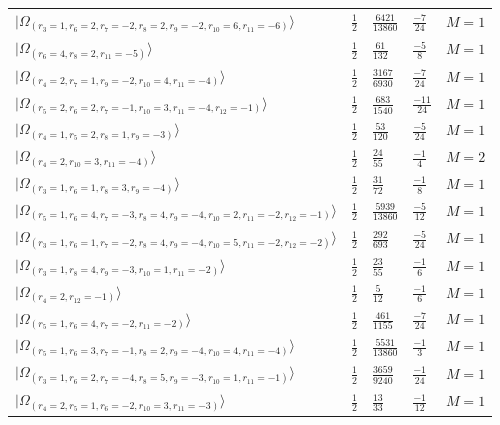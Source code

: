 \documentclass[11pt,twoside,openright]{book}
\begin{document}
\begin{longtable}{p{4cm}llll}
$|\Omega_{(r_{3}=1, r_{6}=2, r_{7}=-2, r_{8}=2, r_{9}=-2, r_{10}=6, r_{11}=-6)}\rangle$ & $\frac{1}{2}$ & $\frac{6421}{13860}$ & $\frac{-7}{24}$ & $M=1$ \\
$|\Omega_{(r_{6}=4, r_{8}=2, r_{11}=-5)}\rangle$ & $\frac{1}{2}$ & $\frac{61}{132}$ & $\frac{-5}{8}$ & $M=1$ \\
$|\Omega_{(r_{4}=2, r_{7}=1, r_{9}=-2, r_{10}=4, r_{11}=-4)}\rangle$ & $\frac{1}{2}$ & $\frac{3167}{6930}$ & $\frac{-7}{24}$ & $M=1$ \\
$|\Omega_{(r_{5}=2, r_{6}=2, r_{7}=-1, r_{10}=3, r_{11}=-4, r_{12}=-1)}\rangle$ & $\frac{1}{2}$ & $\frac{683}{1540}$ & $\frac{-11}{24}$ & $M=1$ \\
$|\Omega_{(r_{4}=1, r_{5}=2, r_{8}=1, r_{9}=-3)}\rangle$ & $\frac{1}{2}$ & $\frac{53}{120}$ & $\frac{-5}{24}$ & $M=1$ \\
$|\Omega_{(r_{4}=2, r_{10}=3, r_{11}=-4)}\rangle$ & $\frac{1}{2}$ & $\frac{24}{55}$ & $\frac{-1}{4}$ & $M=2$ \\
$|\Omega_{(r_{3}=1, r_{6}=1, r_{8}=3, r_{9}=-4)}\rangle$ & $\frac{1}{2}$ & $\frac{31}{72}$ & $\frac{-1}{8}$ & $M=1$ \\
$|\Omega_{(r_{5}=1, r_{6}=4, r_{7}=-3, r_{8}=4, r_{9}=-4, r_{10}=2, r_{11}=-2, r_{12}=-1)}\rangle$ & $\frac{1}{2}$ & $\frac{5939}{13860}$ & $\frac{-5}{12}$ & $M=1$ \\
$|\Omega_{(r_{3}=1, r_{6}=1, r_{7}=-2, r_{8}=4, r_{9}=-4, r_{10}=5, r_{11}=-2, r_{12}=-2)}\rangle$ & $\frac{1}{2}$ & $\frac{292}{693}$ & $\frac{-5}{24}$ & $M=1$ \\
$|\Omega_{(r_{3}=1, r_{8}=4, r_{9}=-3, r_{10}=1, r_{11}=-2)}\rangle$ & $\frac{1}{2}$ & $\frac{23}{55}$ & $\frac{-1}{6}$ & $M=1$ \\
$|Ω_(r_4=2, r_12=-1)⟩$ & $\frac{1}{2}$ & $\frac{5}{12}$ & $\frac{-1}{6}$ & $M=1$ \\
$|\Omega_{(r_{5}=1, r_{6}=4, r_{7}=-2, r_{11}=-2)}\rangle$ & $\frac{1}{2}$ & $\frac{461}{1155}$ & $\frac{-7}{24}$ & $M=1$ \\
$|\Omega_{(r_{5}=1, r_{6}=3, r_{7}=-1, r_{8}=2, r_{9}=-4, r_{10}=4, r_{11}=-4)}\rangle$ & $\frac{1}{2}$ & $\frac{5531}{13860}$ & $\frac{-1}{3}$ & $M=1$ \\
$|\Omega_{(r_{3}=1, r_{6}=2, r_{7}=-4, r_{8}=5, r_{9}=-3, r_{10}=1, r_{11}=-1)}\rangle$ & $\frac{1}{2}$ & $\frac{3659}{9240}$ & $\frac{-1}{24}$ & $M=1$ \\
$|\Omega_{(r_{4}=2, r_{5}=1, r_{6}=-2, r_{10}=3, r_{11}=-3)}\rangle$ & $\frac{1}{2}$ & $\frac{13}{33}$ & $\frac{-1}{12}$ & $M=1$ \\

\end{longtable}
\end{document}
